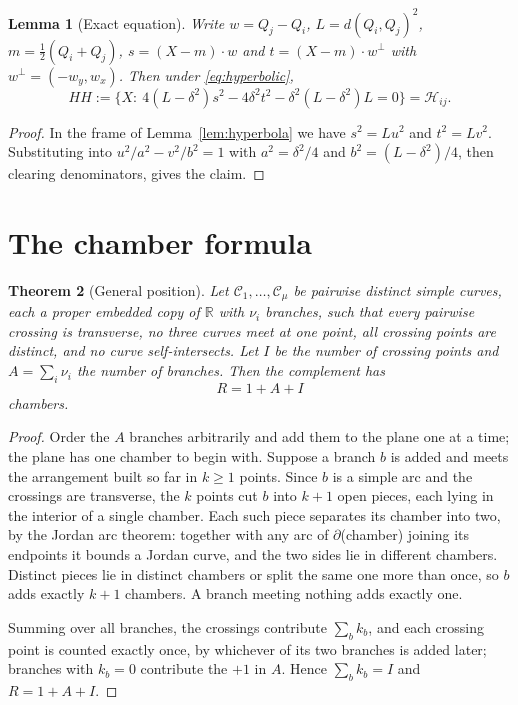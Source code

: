 ﻿\documentclass[11pt,a4paper]{article}
\newtheorem{theorem}{Theorem}[section]
\newtheorem{lemma}[theorem]{Lemma}
\theoremstyle{definition}
\theoremstyle{remark}
\newcommand{\RR}{\mathbb{R}}
\newcommand{\HH}{\mathcal{H}}
\newcommand{\CCu}{\mathcal{C}}
\begin{document}
\begin{lemma}[Exact equation]\label{lem:equation}
Write $w=Q_j-Q_i$, $L=d(Q_i,Q_j)^2$, $m=\tfrac12(Q_i+Q_j)$,
$s=(X-m)\cdot w$ and $t=(X-m)\cdot w^{\perp}$ with $w^{\perp}=(-w_y,w_x)$.
Then under \eqref{eq:hyperbolic},
\[
HH:=\bigl\{X:\ 4(L-\delta^2)s^2-4\delta^2t^2-\delta^2(L-\delta^2)L=0\bigr\}
=\HH_{ij}.
\]
\end{lemma}
\begin{proof}
In the frame of Lemma~\ref{lem:hyperbola} we have $s^2=Lu^2$ and $t^2=Lv^2$.
Substituting into $u^2/a^2-v^2/b^2=1$ with $a^2=\delta^2/4$ and
$b^2=(L-\delta^2)/4$, then clearing denominators, gives the claim.
\end{proof}

\section{The chamber formula}
\label{sec:chambers}

\begin{theorem}[General position]\label{thm:chambers}
Let $\CCu_1,\dots,\CCu_\mu$ be pairwise distinct simple curves, each a proper
embedded copy of $\RR$ with $\nu_i$ branches, such that every pairwise crossing
is transverse, no three curves meet at one point, all crossing points are
distinct, and no curve self-intersects.  Let $I$ be the number of crossing
points and $A=\sum_i\nu_i$ the number of branches.  Then the complement has
\[
R=1+A+I
\]
chambers.
\end{theorem}

\begin{proof}
Order the $A$ branches arbitrarily and add them to the plane one at a time; the
plane has one chamber to begin with.  Suppose a branch $b$ is added and meets
the arrangement built so far in $k\ge1$ points.  Since $b$ is a simple arc and
the crossings are transverse, the $k$ points cut $b$ into $k+1$ open pieces,
each lying in the interior of a single chamber.  Each such piece separates its
chamber into two, by the Jordan arc theorem: together with any arc of
$\partial$(chamber) joining its endpoints it bounds a Jordan curve, and the two
sides lie in different chambers.  Distinct pieces lie in distinct chambers or
split the same one more than once, so $b$ adds exactly $k+1$ chambers.  A branch
meeting nothing adds exactly one.

Summing over all branches, the crossings contribute $\sum_b k_b$, and each
crossing point is counted exactly once, by whichever of its two branches is
added later; branches with $k_b=0$ contribute the $+1$ in $A$.  Hence
$\sum_b k_b=I$ and $R=1+A+I$.
\end{proof}
\end{document}
